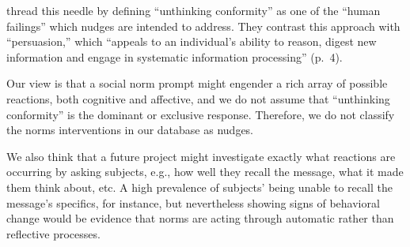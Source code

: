 \documentclass[sn-nature,pdflatex]{sn-jnl}
\begin{document}
\citep{mols2015} thread this needle by defining ``unthinking
conformity'' as one of the ``human failings'' which nudges are intended
to address. They contrast this approach with ``persuasion,'' which
``appeals to an individual's ability to reason, digest new information
and engage in systematic information processing'' (p.~4).

Our view is that a social norm prompt might engender a rich array of
possible reactions, both cognitive and affective, and we do not assume
that ``unthinking conformity'' is the dominant or exclusive response.
Therefore, we do not classify the norms interventions in our database as
nudges.

We also think that a future project might investigate exactly what
reactions are occurring by asking subjects, e.g., how well they recall
the message, what it made them think about, etc. A high prevalence of
subjects' being unable to recall the message's specifics, for instance,
but nevertheless showing signs of behavioral change would be evidence
that norms are acting through automatic rather than reflective
processes.

\newpage

\renewcommand\refname{References}

\end{document}
